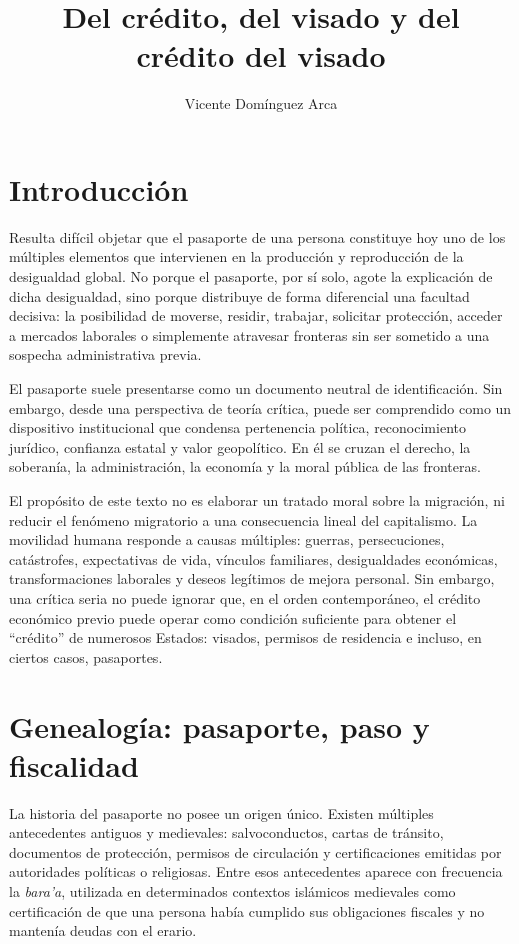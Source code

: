 \documentclass[12pt,a4paper]{article}
\title{Del crédito, del visado y del crédito del visado}
\author{Vicente Domínguez Arca}
\date{}
\begin{document}
\maketitle

\section*{Introducción}

Resulta difícil objetar que el pasaporte de una persona constituye hoy uno de los múltiples elementos que intervienen en la producción y reproducción de la desigualdad global. No porque el pasaporte, por sí solo, agote la explicación de dicha desigualdad, sino porque distribuye de forma diferencial una facultad decisiva: la posibilidad de moverse, residir, trabajar, solicitar protección, acceder a mercados laborales o simplemente atravesar fronteras sin ser sometido a una sospecha administrativa previa.

El pasaporte suele presentarse como un documento neutral de identificación. Sin embargo, desde una perspectiva de teoría crítica, puede ser comprendido como un dispositivo institucional que condensa pertenencia política, reconocimiento jurídico, confianza estatal y valor geopolítico. En él se cruzan el derecho, la soberanía, la administración, la economía y la moral pública de las fronteras.

El propósito de este texto no es elaborar un tratado moral sobre la migración, ni reducir el fenómeno migratorio a una consecuencia lineal del capitalismo. La movilidad humana responde a causas múltiples: guerras, persecuciones, catástrofes, expectativas de vida, vínculos familiares, desigualdades económicas, transformaciones laborales y deseos legítimos de mejora personal. Sin embargo, una crítica seria no puede ignorar que, en el orden contemporáneo, el crédito económico previo puede operar como condición suficiente para obtener el ``crédito'' de numerosos Estados: visados, permisos de residencia e incluso, en ciertos casos, pasaportes.

\section*{Genealogía: pasaporte, paso y fiscalidad}

La historia del pasaporte no posee un origen único. Existen múltiples antecedentes antiguos y medievales: salvoconductos, cartas de tránsito, documentos de protección, permisos de circulación y certificaciones emitidas por autoridades políticas o religiosas. Entre esos antecedentes aparece con frecuencia la \textit{bara'a}, utilizada en determinados contextos islámicos medievales como certificación de que una persona había cumplido sus obligaciones fiscales y no mantenía deudas con el erario.
\end{document}
